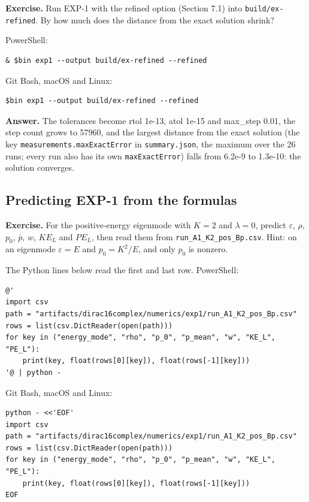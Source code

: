 \documentclass[11pt]{article}
\begin{document}
\textbf{Exercise.} Run EXP-1 with the refined option (Section 7.1) into \texttt{build/ex\allowbreak{}-refined}. By how much does the distance from the exact solution shrink?

PowerShell:

\begin{Verbatim}[fontsize=\small]
& $bin exp1 --output build/ex-refined --refined
\end{Verbatim}

Git Bash, macOS and Linux:

\begin{Verbatim}[fontsize=\small]
$bin exp1 --output build/ex-refined --refined
\end{Verbatim}

\textbf{Answer.} The tolerances become rtol 1e-13, atol 1e-15 and max\_step 0.01, the step count grows to 57960, and the largest distance from the exact solution (the key \texttt{measurem\allowbreak{}ents.max\allowbreak{}ExactErr\allowbreak{}or} in \texttt{summary.\allowbreak{}json}, the maximum over the 26 runs; every run also has its own \texttt{maxExact\allowbreak{}Error}) falls from 6.2e-9 to 1.3e-10: the solution converges.

\subsection{Predicting EXP-1 from the formulas}

\textbf{Exercise.} For the positive-energy eigenmode with $K=2$ and $\lambda=0$, predict $\varepsilon$, $\rho$, $p_0$, $\bar p$, $w$, $KE_L$ and $PE_L$, then read them from \texttt{run\_A1\_K\allowbreak{}2\_pos\_Bp\allowbreak{}.csv}. Hint: on an eigenmode $\varepsilon=E$ and $p_0=K^2/E$, and only $p_0$ is nonzero.

The Python lines below read the first and last row. PowerShell:

\begin{Verbatim}[fontsize=\small]
@'
import csv
path = "artifacts/dirac16complex/numerics/exp1/run_A1_K2_pos_Bp.csv"
rows = list(csv.DictReader(open(path)))
for key in ("energy_mode", "rho", "p_0", "p_mean", "w", "KE_L", "PE_L"):
    print(key, float(rows[0][key]), float(rows[-1][key]))
'@ | python -
\end{Verbatim}

Git Bash, macOS and Linux:

\begin{Verbatim}[fontsize=\small]
python - <<'EOF'
import csv
path = "artifacts/dirac16complex/numerics/exp1/run_A1_K2_pos_Bp.csv"
rows = list(csv.DictReader(open(path)))
for key in ("energy_mode", "rho", "p_0", "p_mean", "w", "KE_L", "PE_L"):
    print(key, float(rows[0][key]), float(rows[-1][key]))
EOF
\end{Verbatim}
\end{document}
